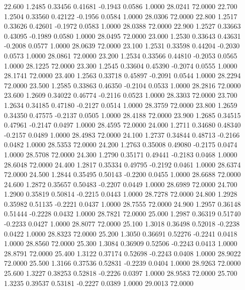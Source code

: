   22.600   1.2485   0.33456   0.41681  -0.1943   0.0586   1.0000  28.0241  72.0000
  22.700   1.2504   0.33560   0.42122  -0.1956   0.0584   1.0000  28.0306  72.0000
  22.800   1.2517   0.33626   0.42601  -0.1972   0.0583   1.0000  28.0388  72.0000
  22.900   1.2527   0.33663   0.43095  -0.1989   0.0580   1.0000  28.0495  72.0000
  23.000   1.2530   0.33643   0.43631  -0.2008   0.0577   1.0000  28.0639  72.0000
  23.100   1.2531   0.33598   0.44204  -0.2030   0.0573   1.0000  28.0861  72.0000
  23.200   1.2534   0.33566   0.44810  -0.2053   0.0565   1.0000  28.1225  72.0000
  23.300   1.2545   0.33604   0.45390  -0.2074   0.0555   1.0000  28.1741  72.0000
  23.400   1.2563   0.33718   0.45897  -0.2091   0.0544   1.0000  28.2294  72.0000
  23.500   1.2585   0.33863   0.46350  -0.2104   0.0533   1.0000  28.2816  72.0000
  23.600   1.2609   0.34022   0.46774  -0.2116   0.0523   1.0000  28.3303  72.0000
  23.700   1.2634   0.34185   0.47180  -0.2127   0.0514   1.0000  28.3759  72.0000
  23.800   1.2659   0.34350   0.47575  -0.2137   0.0505   1.0000  28.4188  72.0000
  23.900   1.2685   0.34515   0.47961  -0.2147   0.0497   1.0000  28.4595  72.0000
  24.000   1.2711   0.34680   0.48340  -0.2157   0.0489   1.0000  28.4983  72.0000
  24.100   1.2737   0.34844   0.48713  -0.2166   0.0482   1.0000  28.5353  72.0000
  24.200   1.2763   0.35008   0.49080  -0.2175   0.0474   1.0000  28.5708  72.0000
  24.300   1.2790   0.35171   0.49441  -0.2183   0.0468   1.0000  28.6048  72.0000
  24.400   1.2817   0.35334   0.49795  -0.2192   0.0461   1.0000  28.6374  72.0000
  24.500   1.2844   0.35495   0.50143  -0.2200   0.0455   1.0000  28.6688  72.0000
  24.600   1.2872   0.35657   0.50483  -0.2207   0.0449   1.0000  28.6989  72.0000
  24.700   1.2900   0.35819   0.50814  -0.2215   0.0443   1.0000  28.7278  72.0000
  24.800   1.2928   0.35982   0.51135  -0.2221   0.0437   1.0000  28.7555  72.0000
  24.900   1.2957   0.36148   0.51444  -0.2228   0.0432   1.0000  28.7821  72.0000
  25.000   1.2987   0.36319   0.51740  -0.2233   0.0427   1.0000  28.8077  72.0000
  25.100   1.3018   0.36498   0.52018  -0.2238   0.0422   1.0000  28.8323  72.0000
  25.200   1.3050   0.36691   0.52276  -0.2241   0.0418   1.0000  28.8560  72.0000
  25.300   1.3084   0.36909   0.52506  -0.2243   0.0413   1.0000  28.8791  72.0000
  25.400   1.3122   0.37174   0.52698  -0.2243   0.0408   1.0000  28.9022  72.0000
  25.500   1.3166   0.37536   0.52831  -0.2239   0.0404   1.0000  28.9263  72.0000
  25.600   1.3227   0.38253   0.52818  -0.2226   0.0397   1.0000  28.9583  72.0000
  25.700   1.3235   0.39537   0.53181  -0.2227   0.0389   1.0000  29.0013  72.0000

